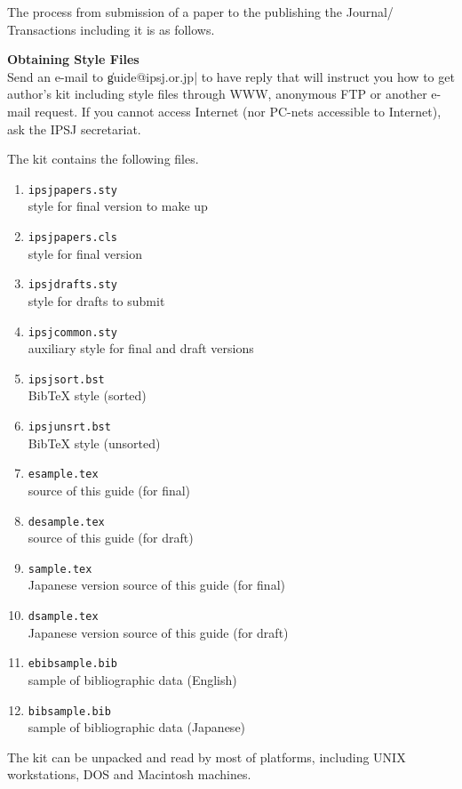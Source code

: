 The process from submission of a paper to the publishing the Journal\slash
Transactions including it is as follows.
%
\begin{Enumerate}%
\item {\bf Obtaining Style Files}\\
Send an e-mail to \|guide@ipsj.or.jp| to have reply that will instruct you
how to get author's kit including style files through WWW, anonymous
FTP or another e-mail request.  If you cannot access Internet (nor PC-nets
accessible to Internet), ask the IPSJ secretariat.

The kit contains the following files.
%
\begin{enumerate}%
\item{\tt ipsjpapers.sty}\mbox{}\\style for final version to make up
\item{\tt ipsjpapers.cls}\mbox{}\\\LATEXe style for final version
\item{\tt ipsjdrafts.sty}\mbox{}\\style for drafts to submit
\item{\tt ipsjcommon.sty}\mbox{}\\auxiliary style for final and draft versions
\item{\tt ipsjsort.bst}\mbox{}\\Bib{\TeX} style (sorted)
\item{\tt ipsjunsrt.bst}\mbox{}\\Bib{\TeX} style (unsorted)
\item{\tt esample.tex}\mbox{}\\source of this guide (for final)
\item{\tt desample.tex}\mbox{}\\source of this guide (for draft)
\item{\tt sample.tex}\mbox{}\\Japanese version source of this guide (for final)
\item{\tt dsample.tex}\mbox{}\\Japanese version source of this guide
(for draft)
\item{\tt ebibsample.bib}\mbox{}\\sample of bibliographic data (English)
\item{\tt bibsample.bib}\mbox{}\\sample of bibliographic data (Japanese)
\end{enumerate}%
%
The kit can be unpacked and read by most of platforms, including UNIX
workstations, DOS and Macintosh machines.


\end{Enumerate}
